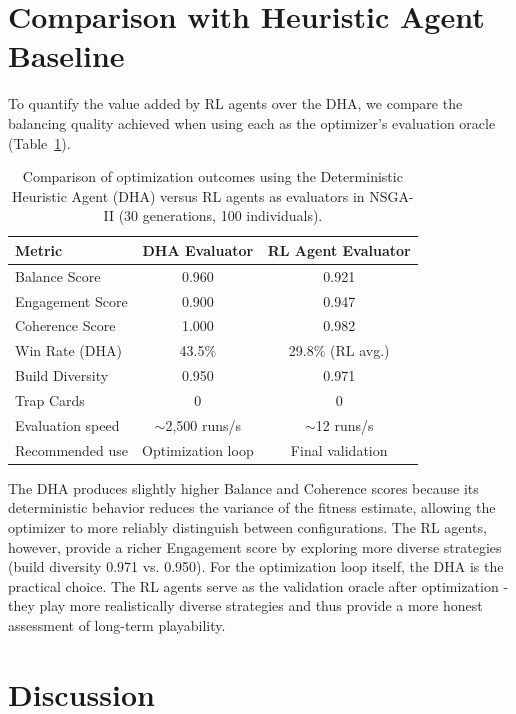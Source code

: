\section{Comparison with Heuristic Agent Baseline}

To quantify the value added by RL agents over the DHA, we compare the balancing quality achieved when using each as the optimizer's evaluation oracle (Table~\ref{tab:dha_vs_rl}).

\begin{table}[htbp]
    \centering
    \caption{Comparison of optimization outcomes using the Deterministic Heuristic Agent (DHA) versus RL agents as evaluators in NSGA-II (30 generations, 100 individuals).}
    \label{tab:dha_vs_rl}
    \begin{tabular}{lcc}
        \toprule
        Metric          & DHA Evaluator & RL Agent Evaluator \\
        \midrule
        Balance Score            & 0.960 & 0.921 \\
        Engagement Score         & 0.900 & 0.947 \\
        Coherence Score          & 1.000 & 0.982 \\
        Win Rate (DHA)           & 43.5\% & 29.8\% (RL avg.) \\
        Build Diversity          & 0.950 & 0.971 \\
        Trap Cards               & 0 & 0 \\
        Evaluation speed         & $\sim$2,500 runs/s & $\sim$12 runs/s \\
        Recommended use          & Optimization loop & Final validation \\
        \bottomrule
    \end{tabular}
\end{table}

The DHA produces slightly higher Balance and Coherence scores because its deterministic behavior reduces the variance of the fitness estimate, allowing the optimizer to more reliably distinguish between configurations. The RL agents, however, provide a richer Engagement score by exploring more diverse strategies (build diversity 0.971 vs. 0.950). For the optimization loop itself, the DHA is the practical choice. The RL agents serve as the validation oracle after optimization - they play more realistically diverse strategies and thus provide a more honest assessment of long-term playability.

\section{Discussion}

